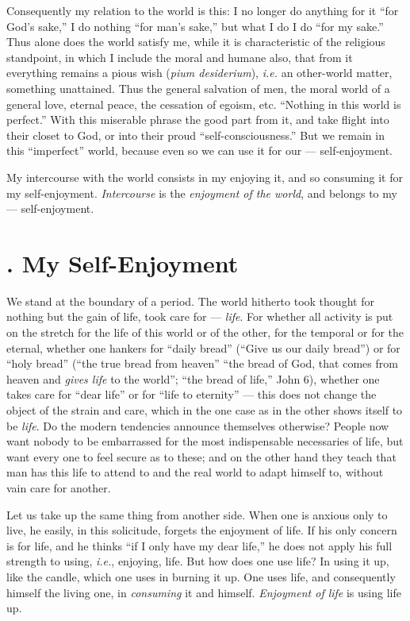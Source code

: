 Consequently my relation to the world is this: I no longer do anything for it 
``for God's sake,'' I do nothing ``for man's sake,'' but what I do I do 
``for my sake.'' Thus alone does the world satisfy me, while it is 
characteristic of the religious standpoint, in which I include the moral and 
humane also, that from it everything remains a pious wish (\textit{pium 
desiderium}), \textit{i.e.} an other-world matter, something unattained. Thus 
the general salvation of men, the moral world of a general love, eternal 
peace, the cessation of egoism, etc. ``Nothing in this world is perfect.'' 
With this miserable phrase the good part from it, and take flight into their 
closet to God, or into their proud ``self-consciousness.'' But we remain in 
this ``imperfect'' world, because even so we can use it for our --- self-enjoyment.

My intercourse with the world consists in my enjoying it, and so consuming it 
for my self-enjoyment. \textit{Intercourse} is the \textit{enjoyment of the 
world}, and belongs to my --- self-enjoyment.

\section[3. My Self-Enjoyment]{. My Self-Enjoyment}

We stand at the boundary of a period. The world hitherto took thought for 
nothing but the gain of life, took care for --- \textit{life}. For whether all 
activity is put on the stretch for the life of this world or of the other, for 
the temporal or for the eternal, whether one hankers for ``daily bread'' 
(``Give us our daily bread'') or for ``holy bread'' (``the true bread 
from heaven'' ``the bread of God, that comes from heaven and \textit{gives 
life} to the world''; ``the bread of life,'' John 6), whether one takes 
care for ``dear life'' or for ``life to eternity'' --- this does not change 
the object of the strain and care, which in the one case as in the other shows 
itself to be \textit{life}. Do the modern tendencies announce themselves 
otherwise? People now want nobody to be embarrassed for the most indispensable 
necessaries of life, but want every one to feel secure as to these; and on the 
other hand they teach that man has this life to attend to and the real world 
to adapt himself to, without vain care for another.

Let us take up the same thing from another side. When one is anxious only to 
live, he easily, in this solicitude, forgets the enjoyment of life. If his 
only concern is for life, and he thinks ``if I only have my dear life,'' he 
does not apply his full strength to using, \textit{i.e.}, enjoying, life. But 
how does one use life? In using it up, like the candle, which one uses in 
burning it up. One uses life, and consequently himself the living one, in 
\textit{consuming} it and himself. \textit{Enjoyment of life} is using life 
up.

